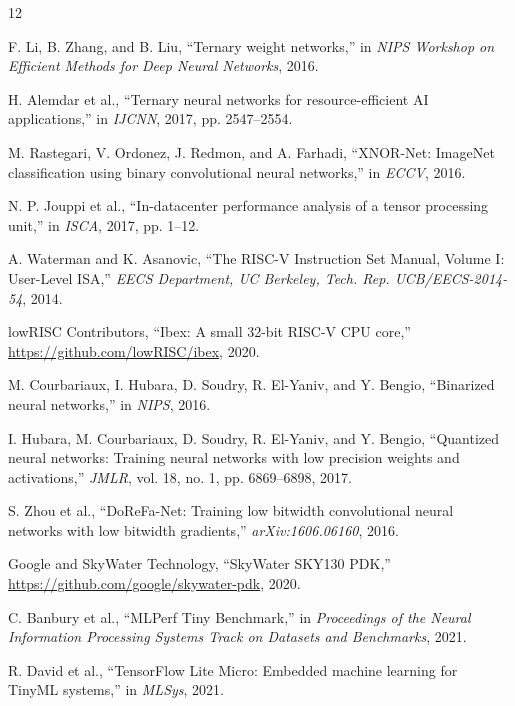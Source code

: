 \documentclass[conference,10pt]{IEEEtran}
\begin{document}
\begin{thebibliography}{12}

F. Li, B. Zhang, and B. Liu, ``Ternary weight networks,'' in \textit{NIPS Workshop on Efficient Methods for Deep Neural Networks}, 2016.

H. Alemdar et al., ``Ternary neural networks for resource-efficient AI applications,'' in \textit{IJCNN}, 2017, pp. 2547--2554.

M. Rastegari, V. Ordonez, J. Redmon, and A. Farhadi, ``XNOR-Net: ImageNet classification using binary convolutional neural networks,'' in \textit{ECCV}, 2016.

N. P. Jouppi et al., ``In-datacenter performance analysis of a tensor processing unit,'' in \textit{ISCA}, 2017, pp. 1--12.

A. Waterman and K. Asanovic, ``The RISC-V Instruction Set Manual, Volume I: User-Level ISA,'' \textit{EECS Department, UC Berkeley, Tech. Rep. UCB/EECS-2014-54}, 2014.

lowRISC Contributors, ``Ibex: A small 32-bit RISC-V CPU core,'' \url{https://github.com/lowRISC/ibex}, 2020.

M. Courbariaux, I. Hubara, D. Soudry, R. El-Yaniv, and Y. Bengio, ``Binarized neural networks,'' in \textit{NIPS}, 2016.

I. Hubara, M. Courbariaux, D. Soudry, R. El-Yaniv, and Y. Bengio, ``Quantized neural networks: Training neural networks with low precision weights and activations,'' \textit{JMLR}, vol. 18, no. 1, pp. 6869--6898, 2017.

S. Zhou et al., ``DoReFa-Net: Training low bitwidth convolutional neural networks with low bitwidth gradients,'' \textit{arXiv:1606.06160}, 2016.

Google and SkyWater Technology, ``SkyWater SKY130 PDK,'' \url{https://github.com/google/skywater-pdk}, 2020.

C. Banbury et al., ``MLPerf Tiny Benchmark,'' in \textit{Proceedings of the Neural Information Processing Systems Track on Datasets and Benchmarks}, 2021.

R. David et al., ``TensorFlow Lite Micro: Embedded machine learning for TinyML systems,'' in \textit{MLSys}, 2021.

\end{thebibliography}
\end{document}
